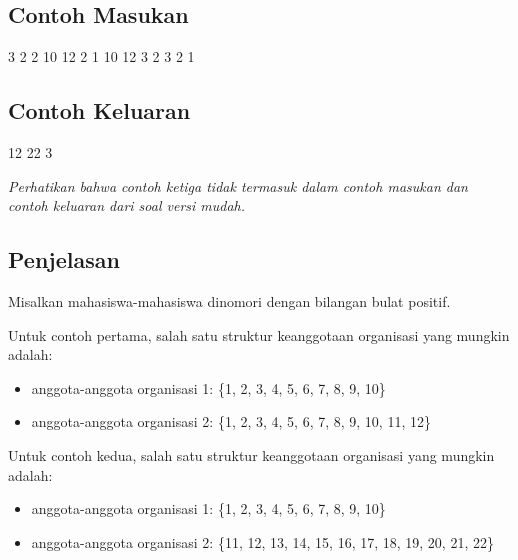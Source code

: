 \documentclass[../main_problemset.tex]{subfiles} %
\begin{document}
\begin{minipage}[t]{0.5\textwidth}
\subsection*{Contoh Masukan}

\begin{lcverbatim}
3
2 2
10 12
2 1
10 12
3 2
3 2 1
\end{lcverbatim}
\end{minipage}
\begin{minipage}[t]{0.5\textwidth}
\subsection*{Contoh Keluaran}

\begin{lcverbatim}
12
22
3
\end{lcverbatim}

\end{minipage}

\textit{Perhatikan bahwa contoh ketiga tidak termasuk dalam contoh masukan dan contoh keluaran dari soal versi mudah.}

\subsection*{Penjelasan}

Misalkan mahasiswa-mahasiswa dinomori dengan bilangan bulat positif.

Untuk contoh pertama, salah satu struktur keanggotaan organisasi yang mungkin adalah:
\begin{itemize}
	\item anggota-anggota organisasi 1: \{1, 2, 3, 4, 5, 6, 7, 8, 9, 10\}
	\item anggota-anggota organisasi 2: \{1, 2, 3, 4, 5, 6, 7, 8, 9, 10, 11, 12\}
\end{itemize}


Untuk contoh kedua, salah satu struktur keanggotaan organisasi yang mungkin adalah:

\begin{itemize}
	\item anggota-anggota organisasi 1: \{1, 2, 3, 4, 5, 6, 7, 8, 9, 10\}
	\item anggota-anggota organisasi 2: \{11, 12, 13, 14, 15, 16, 17, 18, 19, 20, 21, 22\}
\end{itemize}
\end{document}
